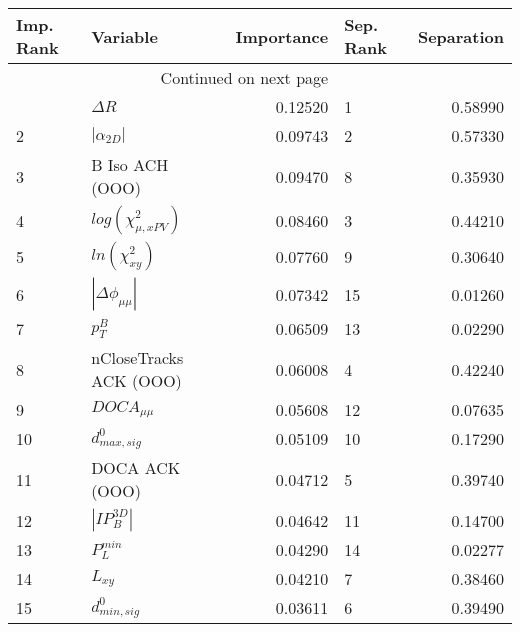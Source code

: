 \usepackage{lscape}

\begin{landscape}
\begin{longtable}{llrlr}
\toprule
Imp. Rank &                   Variable &  Importance & Sep. Rank &  Separation \\
\midrule
\endhead
\midrule
\multicolumn{3}{r}{{Continued on next page}} \\
\midrule
\endfoot

\bottomrule
\endlastfoot
        1 &                 $\Delta R$ &     0.12520 &         1 &     0.58990 \\
        2 &            $|\alpha_{2D}|$ &     0.09743 &         2 &     0.57330 \\
        3 &            B Iso ACH (OOO) &     0.09470 &         8 &     0.35930 \\
        4 &  $log(\chi^{2}_{\mu,xPV})$ &     0.08460 &         3 &     0.44210 \\
        5 &        $ln(\chi^{2}_{xy})$ &     0.07760 &         9 &     0.30640 \\
        6 &   $|\Delta \phi_{\mu\mu}|$ &     0.07342 &        15 &     0.01260 \\
        7 &                  $p^B_{T}$ &     0.06509 &        13 &     0.02290 \\
        8 &     nCloseTracks ACK (OOO) &     0.06008 &         4 &     0.42240 \\
        9 &            $DOCA_{\mu\mu}$ &     0.05608 &        12 &     0.07635 \\
       10 &           $d^0_{max, sig}$ &     0.05109 &        10 &     0.17290 \\
       11 &             DOCA ACK (OOO) &     0.04712 &         5 &     0.39740 \\
       12 &            $|IP_{B}^{3D}|$ &     0.04642 &        11 &     0.14700 \\
       13 &              $P^{min}_{L}$ &     0.04290 &        14 &     0.02277 \\
       14 &                   $L_{xy}$ &     0.04210 &         7 &     0.38460 \\
       15 &           $d^0_{min, sig}$ &     0.03611 &         6 &     0.39490 \\
\end{longtable}

\end{landscape}
